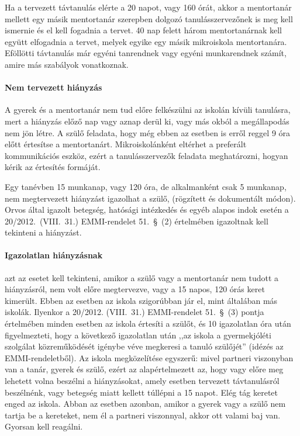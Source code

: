 Ha a tervezett távtanulás elérte a 20 napot, vagy 160 órát, akkor a mentortanár mellett egy másik mentortanár szerepben dolgozó tanulásszervezőnek is meg kell ismernie és el kell fogadnia a tervet. 40 nap felett három mentortanárnak kell együtt elfogadnia a tervet, melyek egyike egy másik mikroiskola mentortanára. Eföllötti távtanulás már egyéni tanrendnek vagy egyéni munkarendnek számít, amire más szabályok vonatkoznak.


\paragraph{Nem tervezett hiányzás} A gyerek és a mentortanár nem tud előre felkészülni az iskolán kívüli tanulásra, mert a hiányzás előző nap vagy aznap derül ki, vagy más okból a megállapodás nem jön létre. A szülő feladata, hogy még ebben az esetben is erről reggel 9 óra előtt értesítse a mentortanárt. Mikroiskolánként eltérhet a preferált kommunikációs eszköz, ezért a tanulásszervezők feladata meghatározni, hogyan kérik az értesítés formáját.

Egy tanévben 15 munkanap, vagy 120 óra, de alkalmanként csak 5 munkanap, nem megtervezett hiányzást igazolhat a szülő, 
(rögzített és dokumentált módon). Orvos által igazolt betegség, hatósági intézkedés és egyéb alapos indok esetén a 20/2012.~(VIII.~31.) EMMI-rendelet 51.~§~(2) értelmében igazoltnak kell tekinteni a hiányzást.

\paragraph{Igazolatlan hiányzásnak} azt az esetet kell tekinteni, amikor a szülő vagy a mentortanár nem tudott a hiányzásról, nem volt előre megtervezve, vagy a 15 napos, 120 órás keret kimerült. Ebben az esetben az iskola szigorúbban jár el, mint általában más iskolák. Ilyenkor a 20/2012. (VIII.~31.) EMMI-rendelet 51.~§~(3) pontja értelmében minden esetben az iskola értesíti a szülőt, és 10 igazolatlan óra után figyelmezteti, hogy a következő igazolatlan után ,,az iskola a gyermekjóléti szolgálat közreműködését igénybe véve megkeresi a tanuló szülőjét'' (idézés az EMMI-rendeletből). Az iskola megközelítése egyszerű: mivel partneri viszonyban van a tanár, gyerek és szülő, ezért az alapértelmezett az, hogy vagy előre meg lehetett volna beszélni a hiányzásokat, amely esetben tervezett távtanulásról beszélnénk, vagy betegség miatt kellett túllépni a 15 napot. Elég tág keretet enged az iskola. Abban az esetben azonban, amikor a gyerek vagy a szülő nem tartja be a kereteket, nem él a partneri viszonnyal, akkor ott valami baj van. Gyorsan kell reagálni.

